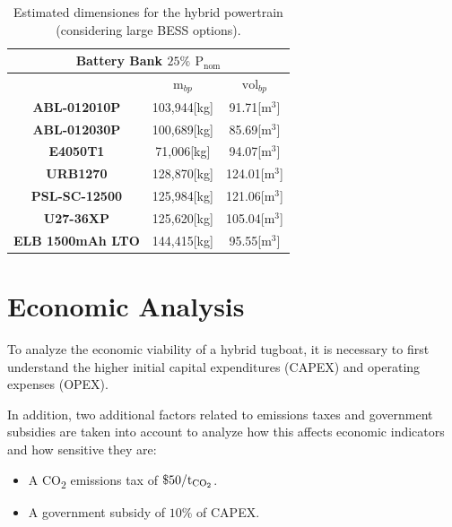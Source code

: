 \begin{table}[H]
	\centering
	\caption{Estimated dimensiones  for the hybrid powertrain (considering large BESS options).}	\label{tab:VW_HybPowerTrain_LargeBESS}
	\begin{tabular}{|c|c|c|}
		\hline
		\multicolumn{3}{|c|}{Battery Bank $25\%$ ${\text{P}}_{\text{nom}}$} \\
		\hline\hline
		 &  $\text{m}_{bp}$ & $\text{vol}_{bp}$\\
		 \hline
		 \textbf{ABL-012010P} &  103,944[kg]  & 91.71[${\text{m}}^{3}$] \\
		 \hline	
		 \textbf{ABL-012030P} & 100,689[kg]  & 85.69[${\text{m}}^{3}$] \\
		 \hline
		 \textbf{E4050T1} & 71,006[kg] & 94.07[${\text{m}}^{3}$] \\
		 \hline\hline
		 
		 \textbf{URB1270} &  128,870[kg]  &  124.01[${\text{m}}^{3}$] \\
		 \hline
		 \textbf{PSL-SC-12500} & 125,984[kg]  & 121.06[${\text{m}}^{3}$] \\
		 \hline
		 \textbf{U27-36XP} & 125,620[kg]  & 105.04[${\text{m}}^{3}$] \\
		 \hline\hline
		 \textbf{ELB 1500mAh LTO} & 144,415[kg]  & 95.55[${\text{m}}^{3}$] \\
		 \hline	
	\end{tabular}
\end{table}

\section{Economic Analysis}

To analyze the economic viability of a hybrid tugboat, it is necessary to first understand the higher initial capital expenditures (CAPEX) and operating expenses (OPEX).

In addition, two additional factors related to emissions taxes and government subsidies are taken into account to analyze how this affects economic indicators and how sensitive they are: 



\begin{itemize}
	\item A CO\textsubscript{2} emissions tax of $\$50/{\text{t}}_{\text{CO\textsubscript{2}}}$.
	\item A government subsidy of $10\%$ of CAPEX.
\end{itemize}



